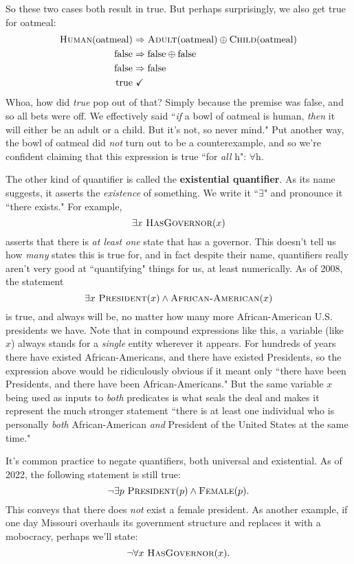 So these two cases both result in true. But perhaps surprisingly, we also
get true for oatmeal:
\begin{align*}
\textsc{Human}(\text{oatmeal}) & \Rightarrow \textsc{Adult}(\text{oatmeal})
\oplus \textsc{Child}(\text{oatmeal}) \\
\text{false} & \Rightarrow \text{false} \oplus \text{false} \\
\text{false} & \Rightarrow \text{false} \\
\text{true} & \ \checkmark
\end{align*}
Whoa, how did \textit{true} pop out of that? Simply because the premise was
false, and so all bets were off. We effectively said ``\textit{if} a bowl
of oatmeal is human, \textit{then} it will either be an adult or a child. But
it's not, so never mind." Put another way, the bowl of oatmeal did
\textit{not} turn out to be a counterexample, and so we're confident
claiming that this expression is true ``for \textit{all} h": $\forall$h.

The other kind of quantifier is called the \textbf{existential quantifier}.
As its name suggests, it asserts the \textit{existence} of something. We
write it ``$\exists$" and pronounce it ``there exists." For example,
\[
\exists x\ \textsc{HasGovernor}(x)
\]
asserts that there is \textit{at least one} state that has a governor. This
doesn't tell us how \textit{many} states this is true for, and in fact
despite their name, quantifiers really aren't very good at ``quantifying"
things for us, at least numerically. As of 2008, the statement
\[
\exists x\ \textsc{President}(x) \wedge \textsc{African-American}(x)
\]
is true, and always will be, no matter how many more African-American U.S.
presidents we have. Note that in compound expressions like this, a variable
(like $x$) always stands for a \textit{single} entity wherever it appears.
For hundreds of years there have existed African-Americans, and there have
existed Presidents, so the expression above would be ridiculously obvious
if it meant only ``there have been Presidents, and there have been
African-Americans." But the same variable $x$ being used as inputs to
\textit{both} predicates is what seals the deal and makes it represent the
much stronger statement ``there is at least one individual who is
personally \textit{both} African-American \textit{and} President of the
United States at the same time."

It's common practice to negate quantifiers, both universal and existential. 
As of 2022, the following statement is still true:
\[
\neg \exists p\ \textsc{President}(p) \wedge \textsc{Female}(p).
\]
This conveys that there does \textit{not} exist a female president. As
another example, if one day Missouri overhauls its government structure and
replaces it with a mobocracy, perhaps we'll state:
\[
\neg \forall x\ \textsc{HasGovernor}(x).
\]


